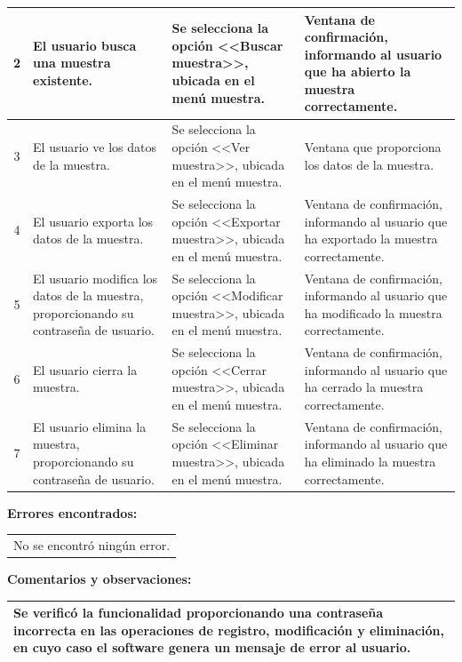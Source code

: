 {\begin{table}[h]
\begin{tabulary}{\anchotabla}{|c|J|J|J|}
			2 & El usuario busca una muestra existente. & Se selecciona la opci\'{o}n <<Buscar muestra>>, ubicada en el men\'{u} muestra. & Ventana de confirmaci\'{o}n, informando al usuario que ha abierto la muestra correctamente.\\ \hline
			
			3 & El usuario ve los datos de la muestra. & Se selecciona la opci\'{o}n <<Ver muestra>>, ubicada en el men\'{u} muestra. & Ventana que proporciona los datos de la muestra.\\ \hline
			
			4 & El usuario exporta los datos de la muestra. & Se selecciona la opci\'{o}n <<Exportar muestra>>, ubicada en el men\'{u} muestra. & Ventana de confirmaci\'{o}n, informando al usuario que ha exportado la muestra correctamente.\\ \hline
			
			5 & El usuario modifica los datos de la muestra, proporcionando su contrase\~{n}a de usuario. & Se selecciona la opci\'{o}n <<Modificar muestra>>, ubicada en el men\'{u} muestra. & Ventana de confirmaci\'{o}n, informando al usuario que ha modificado la muestra correctamente.\\ \hline
			
			6 & El usuario cierra la muestra. & Se selecciona la opci\'{o}n <<Cerrar muestra>>, ubicada en el men\'{u} muestra. & Ventana de confirmaci\'{o}n, informando al usuario que ha cerrado la muestra correctamente.\\ \hline
			
			7 & El usuario elimina la muestra, proporcionando su contrase\~{n}a de usuario. & Se selecciona la opci\'{o}n <<Eliminar muestra>>, ubicada en el men\'{u} muestra. & Ventana de confirmaci\'{o}n, informando al usuario que ha eliminado la muestra correctamente.\\ \hline
		\end{tabulary}
\end{table}
\FloatBarrier
\newpage
\textbf{Errores encontrados:}
\begin{table}[H]
	\centering
	\setlength{\extrarowheight}{\altocelda}
	\begin{tabularx}{\anchotabla}{|X|}
		\hline
		\thead{\textbf{\small{Descripci\'{o}n del error}}}
		\\ \hline
		No se encontr\'{o} ning\'{u}n error.\\ \hline
	\end{tabularx}
\end{table}

\textbf{Comentarios y observaciones:}
\begin{table}[H]
	\centering
	\setlength{\extrarowheight}{\altocelda}
	\begin{tabularx}{\anchotabla}{|X|}
		\hline
		Se verific\'{o} la funcionalidad proporcionando una contrase\~{n}a incorrecta en las operaciones de registro, modificaci\'{o}n y eliminaci\'{o}n, en cuyo caso el software genera un mensaje de error al usuario.\\ \hline
	\end{tabularx}
\end{table}

}
